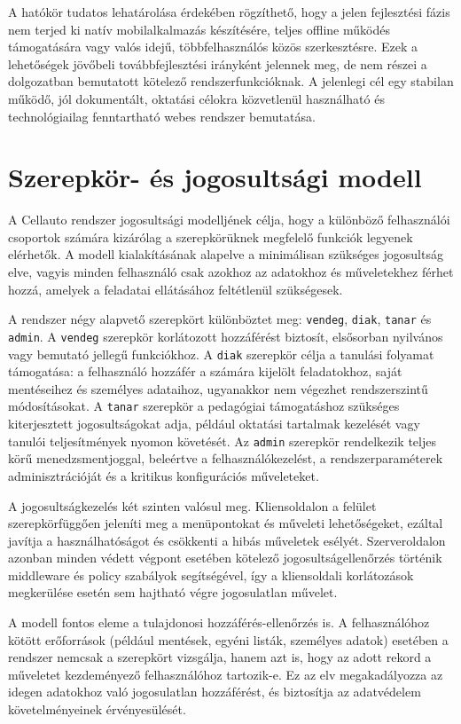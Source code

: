 \documentclass{thesis-ekf}
\begin{document}
A hatókör tudatos lehatárolása érdekében rögzíthető, hogy a jelen fejlesztési fázis nem terjed ki natív mobilalkalmazás készítésére, teljes offline működés támogatására vagy valós idejű, többfelhasználós közös szerkesztésre. Ezek a lehetőségek jövőbeli továbbfejlesztési irányként jelennek meg, de nem részei a dolgozatban bemutatott kötelező rendszerfunkcióknak. A jelenlegi cél egy stabilan működő, jól dokumentált, oktatási célokra közvetlenül használható és technológiailag fenntartható webes rendszer bemutatása.

\section{Szerepkör- és jogosultsági modell}
A Cellauto rendszer jogosultsági modelljének célja, hogy a különböző felhasználói csoportok számára kizárólag a szerepkörüknek megfelelő funkciók legyenek elérhetők. A modell kialakításának alapelve a minimálisan szükséges jogosultság elve, vagyis minden felhasználó csak azokhoz az adatokhoz és műveletekhez férhet hozzá, amelyek a feladatai ellátásához feltétlenül szükségesek.

A rendszer négy alapvető szerepkört különböztet meg: \texttt{vendeg}, \texttt{diak}, \texttt{tanar} és \texttt{admin}. A \texttt{vendeg} szerepkör korlátozott hozzáférést biztosít, elsősorban nyilvános vagy bemutató jellegű funkciókhoz. A \texttt{diak} szerepkör célja a tanulási folyamat támogatása: a felhasználó hozzáfér a számára kijelölt feladatokhoz, saját mentéseihez és személyes adataihoz, ugyanakkor nem végezhet rendszerszintű módosításokat. A \texttt{tanar} szerepkör a pedagógiai támogatáshoz szükséges kiterjesztett jogosultságokat adja, például oktatási tartalmak kezelését vagy tanulói teljesítmények nyomon követését. Az \texttt{admin} szerepkör rendelkezik teljes körű menedzsmentjoggal, beleértve a felhasználókezelést, a rendszerparaméterek adminisztrációját és a kritikus konfigurációs műveleteket.

A jogosultságkezelés két szinten valósul meg. Kliensoldalon a felület szerepkörfüggően jeleníti meg a menüpontokat és műveleti lehetőségeket, ezáltal javítja a használhatóságot és csökkenti a hibás műveletek esélyét. Szerveroldalon azonban minden védett végpont esetében kötelező jogosultságellenőrzés történik middleware és policy szabályok segítségével, így a kliensoldali korlátozások megkerülése esetén sem hajtható végre jogosulatlan művelet.

A modell fontos eleme a tulajdonosi hozzáférés-ellenőrzés is. A felhasználóhoz kötött erőforrások (például mentések, egyéni listák, személyes adatok) esetében a rendszer nemcsak a szerepkört vizsgálja, hanem azt is, hogy az adott rekord a műveletet kezdeményező felhasználóhoz tartozik-e. Ez az elv megakadályozza az idegen adatokhoz való jogosulatlan hozzáférést, és biztosítja az adatvédelem követelményeinek érvényesülését.
\end{document}
